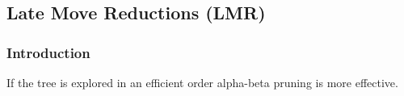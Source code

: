 \subsection{Late Move Reductions (LMR)}

\subsubsection{Introduction}

If the tree is explored in an efficient order alpha-beta pruning is more effective.


